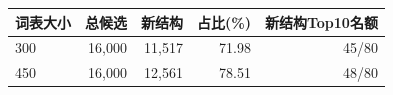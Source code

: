 \begin{tabular*}{\linewidth}{@{\extracolsep{\fill}}lrrrr@{}}\toprule
词表大小 & 总候选 & 新结构 & 占比(\%) & 新结构Top10名额\\\midrule
300 & 16,000 & 11,517 & 71.98 & 45/80\\
450 & 16,000 & 12,561 & 78.51 & 48/80\\
\bottomrule\end{tabular*}